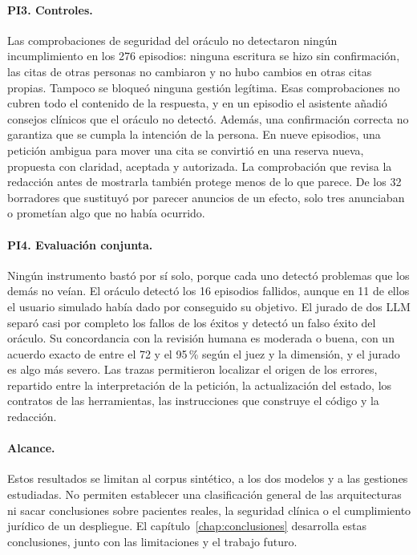 \paragraph{PI3. Controles.}
Las comprobaciones de seguridad del oráculo no detectaron ningún incumplimiento
en los 276 episodios: ninguna escritura se hizo sin confirmación, las citas de
otras personas no cambiaron y no hubo cambios en otras citas propias. Tampoco se
bloqueó ninguna gestión legítima. Esas comprobaciones no cubren todo el
contenido de la respuesta, y en un episodio el asistente añadió consejos
clínicos que el oráculo no detectó. Además, una confirmación correcta no
garantiza que se cumpla la intención de la persona. En nueve episodios, una
petición ambigua para mover una cita se convirtió en una reserva nueva,
propuesta con claridad, aceptada y autorizada. La comprobación que revisa la
redacción antes de mostrarla también protege menos de lo que parece. De los 32
borradores que sustituyó por parecer anuncios de un efecto, solo tres
anunciaban o prometían algo que no había ocurrido.

\paragraph{PI4. Evaluación conjunta.}
Ningún instrumento bastó por sí solo, porque cada uno detectó problemas que los
demás no veían. El oráculo detectó los 16 episodios fallidos, aunque en 11 de
ellos el usuario simulado había dado por conseguido su objetivo. El jurado de
dos LLM separó casi por completo los fallos de los éxitos y detectó un falso
éxito del oráculo. Su concordancia con la revisión humana es moderada o buena,
con un acuerdo exacto de entre el 72 y el 95\,\% según el juez y la dimensión,
y el jurado es algo más severo. Las trazas permitieron localizar el origen de
los errores, repartido entre la interpretación de la petición, la
actualización del estado, los contratos de las herramientas, las instrucciones
que construye el código y la redacción.

\paragraph{Alcance.}
Estos resultados se limitan al corpus sintético, a los dos modelos y a las
gestiones estudiadas. No permiten establecer una clasificación general de las
arquitecturas ni sacar conclusiones sobre pacientes reales, la seguridad
clínica o el cumplimiento jurídico de un despliegue. El
capítulo~\ref{chap:conclusiones} desarrolla estas conclusiones, junto con las
limitaciones y el trabajo futuro.


